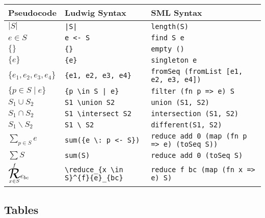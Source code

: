 \begin{tabular}{| l l l |}
\hline
\textbf{Pseudocode} & \textbf{Ludwig Syntax} & \textbf{SML Syntax}\\
\hline
$|S|$ & \verb"|S|" & \verb"length(S)"\\
$e \in S$ & \verb"e <- S" & \verb"find S e"\\
$\{\}$ & \verb"{}" & \verb"empty ()"\\
$\{e\}$ & \verb"{e}" & \verb"singleton e"\\
$\{e_1, e_2, e_3, e_4\}$ & \verb"{e1, e2, e3, e4}" & \verb"fromSeq (fromList [e1, e2, e3, e4])"\\
$\{p \in S \mid e\}$ & \verb"{p \in S | e}" & \verb"filter (fn p => e) S"\\
$S_1 \cup S_2$ & \verb"S1 \union S2" & \verb"union (S1, S2)"\\
$S_1 \cap S_2$ & \verb"S1 \intersect S2" & \verb"intersection (S1, S2)"\\
$S_1 \backslash S_2$ & \verb"S1 \ S2" & \verb"different(S1, S2)"\\
$\displaystyle \sum_{p \in S}{e}$ & \verb"sum({e \: p <- S})" & \verb"reduce add 0 (map (fn p => e) (toSeq S))"\\
$\displaystyle \sum{S}$ & \verb"sum(S)" & \verb"reduce add 0 (toSeq S)"\\
$\overset{f}{\underset{x \in S}{\reduce}}{e}_{bc}$ & \verb"\reduce_{x \in S}^{f}{e}_{bc}" & \verb"reduce f bc (map (fn x => e) S)"\\
\hline
\end{tabular}

\subsection{Tables}

